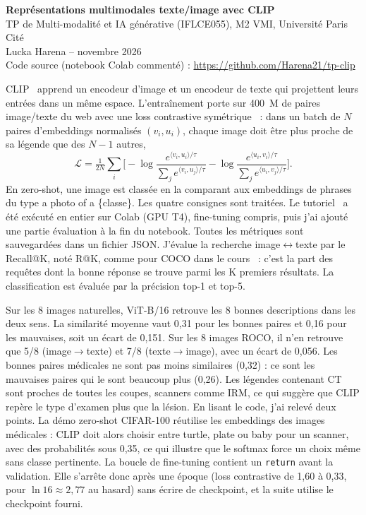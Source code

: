 \documentclass[12pt,a4paper]{article}
\newcommand{\lienCode}{\url{https://github.com/Harena21/tp-clip}}
\newcommand{\sect}[1]{\vspace{4pt}{\large\bfseries #1}\par\vspace{1pt}}
\begin{document}
\begin{center}
{\Large\bfseries Représentations multimodales texte/image avec CLIP}\\[2pt]
TP de Multi-modalité et IA générative (IFLCE055), M2 VMI, Université Paris Cité\\[1pt]
Lucka Harena \quad-- novembre 2026\\[1pt]
Code source (notebook Colab commenté) : \lienCode
\end{center}

\sect{1. Méthode et état d'avancement}
CLIP~\cite{radford} apprend un encodeur d'image et un encodeur de texte qui projettent leurs entrées dans un même espace. L'entraînement porte sur 400~M de paires image/texte du web avec une loss contrastive symétrique~\cite{cours} : dans un batch de $N$ paires d'embeddings normalisés $(v_i,u_i)$, chaque image doit être plus proche de sa légende que des $N-1$ autres,
\begin{equation*}
\mathcal{L}=\tfrac{1}{2N}\textstyle\sum_{i}\Big[-\log\frac{e^{\langle v_i,u_i\rangle/\tau}}{\sum_j e^{\langle v_i,u_j\rangle/\tau}}-\log\frac{e^{\langle u_i,v_i\rangle/\tau}}{\sum_j e^{\langle u_i,v_j\rangle/\tau}}\Big].
\end{equation*}
En zero-shot, une image est classée en la comparant aux embeddings de phrases du type \og a photo of a \{classe\}\fg.
Les quatre consignes sont traitées. Le tutoriel~\cite{tuto} a été exécuté en entier sur Colab (GPU T4), fine-tuning compris, puis j'ai ajouté une partie évaluation à la fin du notebook. Toutes les métriques sont sauvegardées dans un fichier JSON. J'évalue la recherche image$\leftrightarrow$texte par le Recall@K, noté R@K, comme pour COCO dans le cours~\cite{cours} : c'est la part des requêtes dont la bonne réponse se trouve parmi les K premiers résultats. La classification est évaluée par la précision top-1 et top-5.

\sect{2. Prise en main du tutoriel (consigne 1)}
Sur les 8 images naturelles, ViT-B/16 retrouve les 8 bonnes descriptions dans les deux sens. La similarité moyenne vaut 0,31 pour les bonnes paires et 0,16 pour les mauvaises, soit un écart de 0,151. Sur les 8 images ROCO, il n'en retrouve que 5/8 (image$\to$texte) et 7/8 (texte$\to$image), avec un écart de 0,056. Les bonnes paires médicales ne sont pas moins similaires (0,32) : ce sont les mauvaises paires qui le sont beaucoup plus (0,26). Les légendes contenant \og CT\fg{} sont proches de toutes les coupes, scanners comme IRM, ce qui suggère que CLIP repère le type d'examen plus que la lésion.
En lisant le code, j'ai relevé deux points. La démo zero-shot CIFAR-100 réutilise les embeddings des images médicales : CLIP doit alors choisir entre \og turtle\fg, \og plate\fg{} ou \og baby\fg{} pour un scanner, avec des probabilités sous 0,35, ce qui illustre que le softmax force un choix même sans classe pertinente. La boucle de fine-tuning contient un \texttt{return} avant la validation. Elle s'arrête donc après une époque (loss contrastive de 1,60 à 0,33, pour $\ln 16\approx2{,}77$ au hasard) sans écrire de checkpoint, et la suite utilise le checkpoint fourni.
\end{document}
